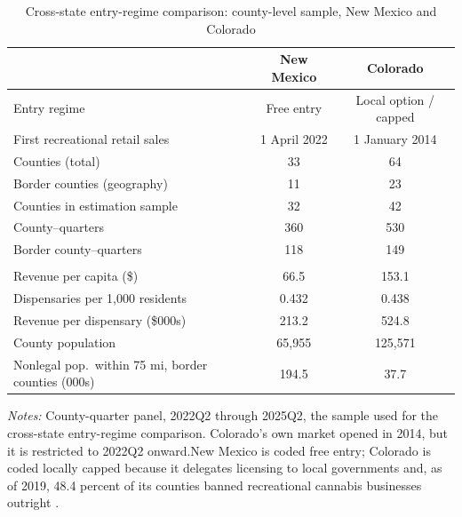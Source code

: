 \begin{table}[htbp]
\centering
\caption{Cross-state entry-regime comparison: county-level sample, New Mexico and Colorado}
\label{tab:sumstats_state}
\footnotesize
\begin{tabular}{lcc}
\toprule
 & New Mexico & Colorado \\
\midrule
Entry regime & Free entry & Local option / capped \\
First recreational retail sales & 1 April 2022 & 1 January 2014 \\
\addlinespace
Counties (total) & 33 & 64 \\
\quad Border counties (geography) & 11 & 23 \\
\addlinespace
Counties in estimation sample & 32 & 42 \\
County--quarters & 360 & 530 \\
\quad Border county--quarters & 118 & 149 \\
\addlinespace
\multicolumn{3}{l}{\textit{County-quarter means}} \\
\quad Revenue per capita (\$) & 66.5 & 153.1 \\
\quad Dispensaries per 1,000 residents & 0.432 & 0.438 \\
\quad Revenue per dispensary (\$000s) & 213.2 & 524.8 \\
\quad County population & 65,955 & 125,571 \\
\quad Nonlegal pop.\ within 75 mi, border counties (000s) & 194.5 & 37.7 \\
\bottomrule
\end{tabular}
\begin{minipage}{0.86\textwidth}
\vspace{0.4em}\footnotesize
\textit{Notes:} County-quarter panel, 2022Q2 through 2025Q2, the sample used for the cross-state entry-regime comparison. Colorado's own market opened in 2014, but it is restricted to 2022Q2 onward.New Mexico is coded free entry; Colorado is coded locally capped because it delegates licensing to local governments and, as of 2019, 48.4 percent of its counties banned recreational cannabis businesses outright \citep{PayanBrownSong2021}.
\end{minipage}
\end{table}
